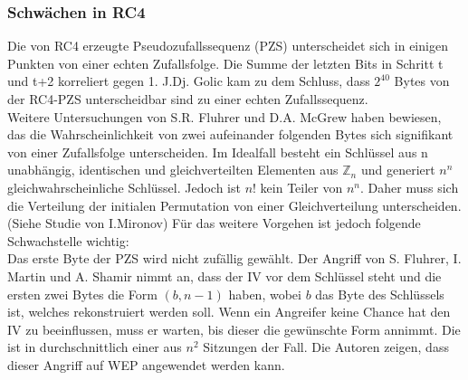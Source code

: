 \documentclass[10pt,a4paper]{article}
\begin{document}
\subsubsection{Schwächen in RC4}\label{ssec:schwäche} 
Die von RC4 erzeugte Pseudozufallssequenz (PZS) unterscheidet sich in einigen Punkten von einer echten Zufallsfolge. Die Summe der letzten Bits in Schritt t und t+2 korreliert gegen 1.
J.Dj. Golic kam zu dem Schluss, dass ${2}^{40}$ Bytes von der RC4-PZS unterscheidbar sind zu einer echten Zufallssequenz.\\
Weitere Untersuchungen von S.R. Fluhrer und D.A. McGrew haben bewiesen, das die Wahrscheinlichkeit von zwei aufeinander folgenden Bytes sich signifikant von einer Zufallsfolge unterscheiden. Im Idealfall besteht ein Schlüssel aus n unabhängig, identischen und gleichverteilten Elementen aus $\mathbb{Z}_n$ und generiert $n^n$ gleichwahrscheinliche Schlüssel. Jedoch ist $n!$ kein Teiler von $n^n$. Daher muss sich die Verteilung der initialen Permutation von einer Gleichverteilung unterscheiden. (Siehe Studie von I.Mironov)
Für das weitere Vorgehen ist jedoch folgende Schwachstelle wichtig:\\
Das erste Byte der PZS wird nicht zufällig gewählt. Der Angriff von S. Fluhrer, I. Martin und A. Shamir \cite{FMS01} nimmt an, dass der IV vor dem Schlüssel steht und die ersten zwei Bytes die Form $(b,n-1)$ haben, wobei $b$ das Byte des Schlüssels ist, welches rekonstruiert werden soll. Wenn ein Angreifer keine Chance hat den IV zu beeinflussen, muss er warten, bis dieser die gewünschte Form annimmt. Die ist in durchschnittlich einer aus $n^2$ Sitzungen der Fall. Die Autoren zeigen, dass dieser Angriff auf WEP angewendet werden kann.
\end{document}
